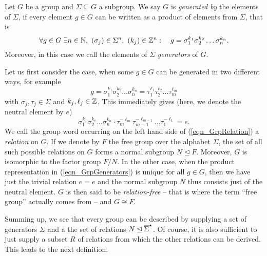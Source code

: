 \begin{definition}
Let $G$ be a group and $\Sigma \subseteq G$ a subgroup. We say $G$ is \emph{generated by} the elements of $\Sigma$, if every element $g \in G$ can be written as a product of elements from $\Sigma$, that is 
\begin{equation}
\label{eqn_GrpGenerators}
\forall g \in G\ \exists n \in \mathbb{N},\ (\sigma_j) \in \Sigma^n,\ (k_j) \in \mathbb{Z}^n:\quad 
g = \sigma_1^{k_1} \sigma_2^{k_2} \dots \sigma_n^{k_n}.
\end{equation}
Moreover, in this case we call the elements of $\Sigma$ \emph{generators} of $G$. 
\end{definition}

Let us first consider the case, when some $g \in G$ can be generated in two  different ways, for example
\begin{equation*}
g = \sigma_1^{k_1} \sigma_2^{k_2} \dots \sigma_n^{k_n} 
  = \tau_1^{\ell_1} \tau_2^{\ell_2} \dots \tau_m^{\ell_m}
\end{equation*}
with $\sigma_j, \tau_j \in \Sigma$ and $k_j, \ell_j \in \mathbb{Z}$. This immediately gives (here, we denote the neutral element by $e$)
\begin{equation}
\label{eqn_GrpRelation}
\sigma_1^{k_1} \sigma_2^{k_e} \dots \sigma_n^{k_n} \cdot
\tau_m^{-\ell_m} \tau_{m-1}^{-\ell_{m-1}} \dots \tau_1^{-\ell_1} = e.
\end{equation}
We call the group word occurring on the left hand side of (\ref{eqn_GrpRelation}) a \emph{relation} on $G$. If we denote by $F$ the free group over the alphabet $\Sigma$, the set of all such possible relations on $G$ forms a normal subgroup $N \unlhd F$. Moreover, $G$ is isomorphic to the factor group $F/N$. In the other case, when the product representation in (\ref{eqn_GrpGenerators}) is unique for all $g \in G$, then we have just the trivial relation $e = e$ and the normal subgroup $N$ thus consists just of the neutral element. $G$ is then said to be \emph{relation-free} -- that is where the term ``free group'' actually comes from -- and $G \cong F$. 

Summing up, we see that every group can be described by supplying a set of generators $\Sigma$ and a the set of relations $N \unlhd {\overline{\Sigma}}^{\star}$. Of course, it is also sufficient to just supply a subset $R$ of relations from which the other relations can be derived. This leads to the next definition.

